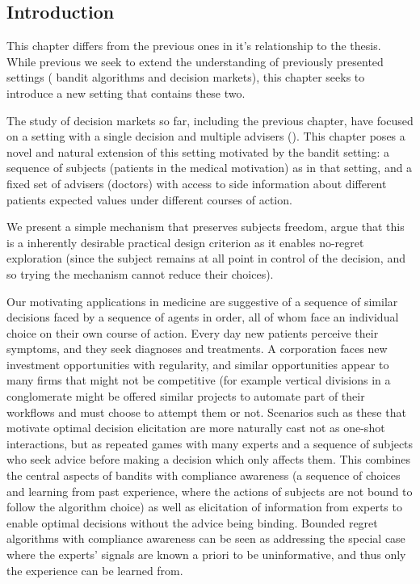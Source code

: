 

\subsection{Introduction}

This chapter differs from the previous ones in it's relationship to the thesis. 
While previous we seek to extend the understanding of previously presented settings ( bandit algorithms and decision markets), this chapter seeks to introduce a new setting that contains these two.

The study of decision markets so far, including the previous chapter, have focused on a setting with a single decision and multiple advisers (\cite{hanson2002decision,othman2010decision,chen2014eliciting}).
This chapter poses a novel and natural extension of this setting motivated by the bandit setting: a sequence of subjects (patients in the medical motivation) as in that setting, and a fixed set of advisers (doctors) with access to side information about different patients expected values under different courses of action. 

We present a simple mechanism that preserves subjects freedom, argue that this is a inherently desirable practical design criterion as it enables no-regret exploration (since the subject remains at all point in control of the decision, and so trying the mechanism cannot reduce their choices).


Our motivating applications in medicine are suggestive of a sequence of similar decisions faced by a sequence of agents in order, all of whom face an individual choice on their own course of action.
Every day new patients perceive their symptoms, and they seek diagnoses and treatments. 
A corporation faces new investment opportunities with regularity, and similar opportunities appear to many firms that might not be competitive (for example vertical divisions in a conglomerate might be offered similar projects to automate part of their workflows and must choose to attempt them or not.
Scenarios such as these that motivate optimal decision elicitation are more naturally cast not as one-shot interactions, but as repeated games with many experts and a sequence of subjects who seek advice before making a decision which only affects them.
This combines the central aspects of bandits with compliance awareness (a sequence of choices and learning from past experience, where the actions of subjects are not bound to follow the algorithm choice) as well as elicitation of information from experts to enable optimal decisions without the advice being binding. 
Bounded regret algorithms with compliance awareness can be seen as addressing the special case where the experts' signals are known a priori to be uninformative, and thus only the experience can be learned from.

